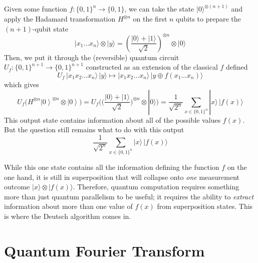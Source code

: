 \documentclass{article}
\newcommand{\ket}[1]{\ensuremath{\left|#1\right\rangle}}
\newcounter{question}[section]
\newcounter{theorem}[section]
\newcounter{algo}[section]
\begin{document}
    \begin{theorem}
      \label{thm:quantum-parallelism-of-n-bit-input}
      Given some function $f: \{0, 1\}^n \to \{0, 1\}$, we can take the state $|0\rangle^{\otimes (n+1)}$ and apply the Hadamard transformation $H^{\otimes n}$ on the first $n$ qubits to prepare the $(n+1)$-qubit state 
      \begin{equation} 
        |x_1 \ldots x_n \rangle \otimes |y\rangle = \left( \frac{|0\rangle + |1\rangle}{\sqrt{2}}\right)^{\otimes n} \otimes |0\rangle
      \end{equation}
      Then, we put it through the (reversible) quantum circuit $U_f: \{0, 1\}^{n+1} \to \{0, 1\}^{n+1}$ constructed as an extension of the classical $f$ defined 
      \begin{equation} 
        U_f \, |x_1 x_2 \ldots x_n \rangle \, |y\rangle \mapsto |x_1 x_2 \ldots x_n \rangle \, |y \oplus f(x_1 \ldots x_n)\rangle
      \end{equation}
      which gives 
      \begin{equation} 
        U_f \big( H^{\otimes n} \ket{0}^{\otimes n} \otimes \ket{0} \big) = U_f \Bigg( \bigg( \frac{|0\rangle + |1\rangle}{\sqrt{2}} \bigg)^{\otimes n} \otimes |0\rangle \Bigg) = \frac{1}{\sqrt{2^n}} \sum_{x \in \{0, 1\}^n} |x\rangle \, |f(x)\rangle
      \end{equation}
      This output state contains information about all of the possible values $f(x)$. But the question still remains what to do with this output 
      \begin{equation} 
        \frac{1}{\sqrt{2^n}} \sum_{x \in \{0, 1\}^n} |x\rangle \, |f(x)\rangle
      \end{equation}
    \end{theorem}

    While this one state contains all the information defining the function $f$ on the one hand, it is still in superposition that will collapse onto \textit{one} measurement outcome $|x \rangle \otimes |f(x) \rangle$. Therefore, quantum computation requires something more than just quantum parallelism to be useful; it requires the ability to \textit{extract} information about more than one value of $f(x)$ from superposition states. This is where the Deutsch algorithm comes in. 

\section{Quantum Fourier Transform} 
\end{document}
